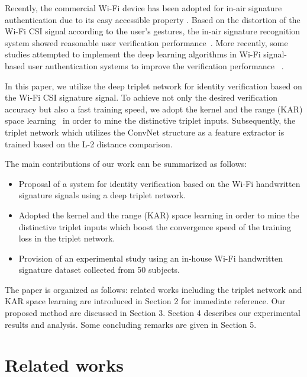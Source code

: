 \documentclass[sigconf]{acmart}
\begin{document}
Recently, the commercial Wi-Fi device has been adopted for in-air signature authentication due to its easy accessible property \cite{moon2017air}. Based on the distortion of the  Wi-Fi CSI signal according to the user's gestures, the in-air signature recognition system showed reasonable user verification performance~\cite{moon2017air}. More recently, some studies attempted to implement the deep learning algorithms in Wi-Fi signal-based user authentication systems to improve the verification performance ~\cite{shi2017smart,pokkunuru2018neuralwave}. 

In this paper, we utilize the deep triplet network for identity verification based on the Wi-Fi CSI signature signal. To achieve not only the desired verification accuracy but also a fast training speed, we adopt the kernel and the range (KAR) space learning~\cite{toh100,toh2018learning,toh2018analytic,toh2018gradient} in order to mine the distinctive triplet inputs. Subsequently, the triplet network which utilizes the ConvNet structure as a feature extractor is trained based on the L-2 distance comparison.

The main contributions of our work can be summarized as follows:
\begin{itemize}
\item Proposal of a system for identity verification based on the Wi-Fi handwritten signature signals using a deep triplet network.
\item Adopted the kernel and the range (KAR) space learning in order to mine the distinctive triplet inputs which boost the convergence speed of the training loss in the triplet network.
\item Provision of an experimental study using an in-house Wi-Fi handwritten signature dataset collected from 50 subjects.
\end{itemize}

The paper is organized as follows: related works including the triplet network and KAR space learning are introduced in Section 2 for immediate reference. Our proposed method are discussed in Section 3. Section 4 describes our experimental results and analysis. Some concluding remarks are given in Section 5.

\section{Related works}
\end{document}
